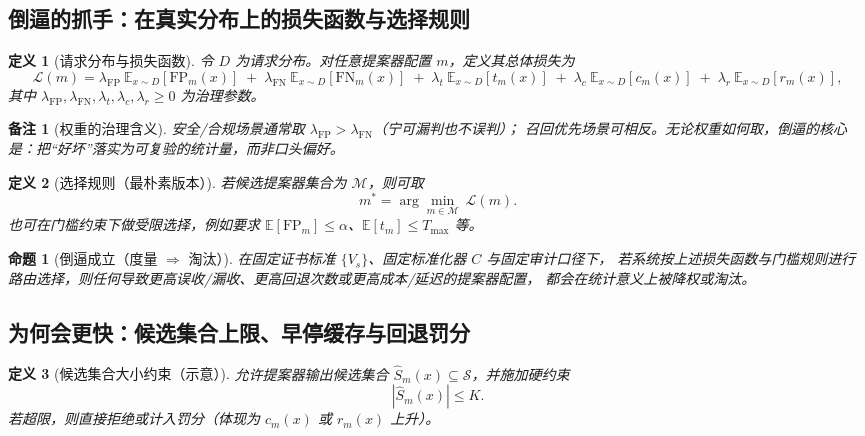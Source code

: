 \documentclass[12pt]{article}
\newtheorem{definition}{定义}[section]
\newtheorem{proposition}{命题}[section]
\newtheorem{remark}{备注}[section]
\begin{document}
\begin{CJK*}{UTF8}{gkai}
\subsection{倒逼的抓手：在真实分布上的损失函数与选择规则}
\label{subsec:loss-and-selection}

\begin{definition}[请求分布与损失函数]
令 $D$ 为请求分布。对任意提案器配置 $m$，定义其总体损失为
\[
\mathcal{L}(m)=
\lambda_{\mathrm{FP}}\ \mathbb{E}_{x\sim D}[\mathrm{FP}_m(x)]
\;+\;
\lambda_{\mathrm{FN}}\ \mathbb{E}_{x\sim D}[\mathrm{FN}_m(x)]
\;+\;
\lambda_t\ \mathbb{E}_{x\sim D}[t_m(x)]
\;+\;
\lambda_c\ \mathbb{E}_{x\sim D}[c_m(x)]
\;+\;
\lambda_r\ \mathbb{E}_{x\sim D}[r_m(x)],
\]
其中 $\lambda_{\mathrm{FP}},\lambda_{\mathrm{FN}},\lambda_t,\lambda_c,\lambda_r\ge 0$ 为治理参数。
\end{definition}

\begin{remark}[权重的治理含义]
安全/合规场景通常取 $\lambda_{\mathrm{FP}}>\lambda_{\mathrm{FN}}$（宁可漏判也不误判）；
召回优先场景可相反。无论权重如何取，倒逼的核心是：把“好坏”落实为可复验的统计量，而非口头偏好。
\end{remark}

\begin{definition}[选择规则（最朴素版本）]
若候选提案器集合为 $\mathcal{M}$，则可取
\[
m^\ast=\arg\min_{m\in\mathcal{M}}\ \mathcal{L}(m).
\]
也可在门槛约束下做受限选择，例如要求 $\mathbb{E}[\mathrm{FP}_m]\le \alpha$、$\mathbb{E}[t_m]\le T_{\max}$ 等。
\end{definition}

\begin{proposition}[倒逼成立（度量 $\Rightarrow$ 淘汰）]
在固定证书标准 $\{V_s\}$、固定标准化器 $C$ 与固定审计口径下，
若系统按上述损失函数与门槛规则进行路由选择，则任何导致更高误收/漏收、更高回退次数或更高成本/延迟的提案器配置，
都会在统计意义上被降权或淘汰。
\end{proposition}

\subsection{为何会更快：候选集合上限、早停缓存与回退罚分}
\label{subsec:faster-pressure}

\begin{definition}[候选集合大小约束（示意）]
允许提案器输出候选集合 $\widehat{S}_m(x)\subseteq\mathcal{S}$，并施加硬约束
\[
|\widehat{S}_m(x)|\le K.
\]
若超限，则直接拒绝或计入罚分（体现为 $c_m(x)$ 或 $r_m(x)$ 上升）。
\end{definition}


\end{CJK*}
\end{document}
